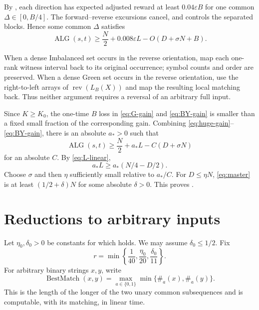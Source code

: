 \documentclass[11pt]{article}
\theoremstyle{remark}
\newcommand{\rev}{\operatorname{rev}}
\newcommand{\eps}{\varepsilon}
\newcommand{\BestMatch}{\operatorname{BestMatch}}
\begin{document}
By , each direction has
expected adjusted reward at least $0.04\eps B$ for one common
$\Delta\in[0,B/4]$.  The forward--reverse excursions cancel, and
 controls the separated blocks.  Hence some common
$\Delta$ satisfies
\begin{equation}\label{eq:BY-gain}
 \operatorname{ALG}(s,t)
 \ge\frac N2+0.008\eps L-O(D+\sigma N+B).
\end{equation}

When a dense Imbalanced set occurs in the reverse orientation, map each
one-rank witness interval back to its original occurrence; symbol counts and
order are preserved.  When a dense Green set occurs in the reverse
orientation, use the right-to-left arrays of $\rev(L_B(X))$ and map the
resulting local matching back.  Thus neither argument requires a reversal of
an arbitrary full input.

Since $K\ge K_0$, the one-time $B$ loss in
\eqref{eq:G-gain} and \eqref{eq:BY-gain} is smaller than a fixed small fraction of the
corresponding gain.  Combining \eqref{eq:huge-gain}--\eqref{eq:BY-gain},
there is an absolute $a_*>0$ such that
\begin{equation}\label{eq:master}
 \operatorname{ALG}(s,t)
 \ge\frac N2+a_*L-C(D+\sigma N)
\end{equation}
for an absolute $C$.  By \eqref{eq:L-linear},
\[
 a_*L\ge a_*\left(N/4-D/2\right).
\]
Choose $\sigma$ and then $\eta$ sufficiently small relative to $a_*/C$.
For $D\le\eta N$, \eqref{eq:master} is at least
$(1/2+\delta)N$ for some absolute $\delta>0$.  This proves
.

\section{Reductions to arbitrary inputs}
\label{sec:reductions}

Let $\eta_0,\delta_0>0$ be constants for which
 holds.  We may assume $\delta_0\le1/2$.  Fix
\begin{equation}\label{eq:near-balance-r}
 r=\min\left\{\frac1{40},\frac{\eta_0}{20},
                    \frac{\delta_0}{11}\right\}.
\end{equation}
For arbitrary binary strings $x,y$, write
\begin{equation}\label{eq:best-match}
 \BestMatch(x,y)=
 \max_{a\in\{0,1\}}\min\{\#_a(x),\#_a(y)\}.
\end{equation}
This is the length of the longer of the two unary common
subsequences and is computable, with its matching, in linear time.
\end{document}
